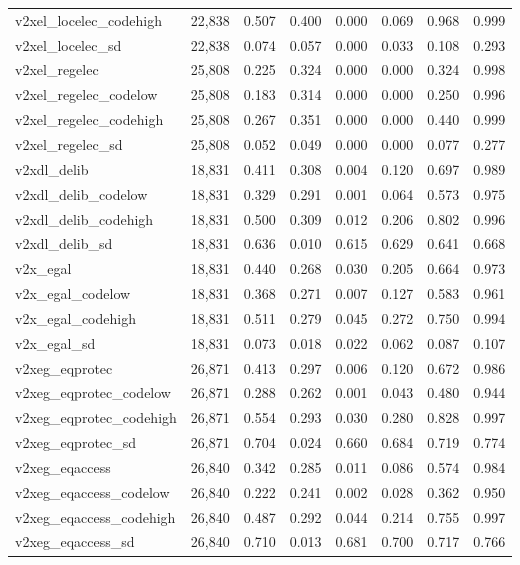 \begin{table}[!htbp]
\begin{tabular}{@{\extracolsep{5pt}}lccccccc}
v2xel\_locelec\_codehigh & 22,838 & 0.507 & 0.400 & 0.000 & 0.069 & 0.968 & 0.999 \\ 
v2xel\_locelec\_sd & 22,838 & 0.074 & 0.057 & 0.000 & 0.033 & 0.108 & 0.293 \\ 
v2xel\_regelec & 25,808 & 0.225 & 0.324 & 0.000 & 0.000 & 0.324 & 0.998 \\ 
v2xel\_regelec\_codelow & 25,808 & 0.183 & 0.314 & 0.000 & 0.000 & 0.250 & 0.996 \\ 
v2xel\_regelec\_codehigh & 25,808 & 0.267 & 0.351 & 0.000 & 0.000 & 0.440 & 0.999 \\ 
v2xel\_regelec\_sd & 25,808 & 0.052 & 0.049 & 0.000 & 0.000 & 0.077 & 0.277 \\ 
v2xdl\_delib & 18,831 & 0.411 & 0.308 & 0.004 & 0.120 & 0.697 & 0.989 \\ 
v2xdl\_delib\_codelow & 18,831 & 0.329 & 0.291 & 0.001 & 0.064 & 0.573 & 0.975 \\ 
v2xdl\_delib\_codehigh & 18,831 & 0.500 & 0.309 & 0.012 & 0.206 & 0.802 & 0.996 \\ 
v2xdl\_delib\_sd & 18,831 & 0.636 & 0.010 & 0.615 & 0.629 & 0.641 & 0.668 \\ 
v2x\_egal & 18,831 & 0.440 & 0.268 & 0.030 & 0.205 & 0.664 & 0.973 \\ 
v2x\_egal\_codelow & 18,831 & 0.368 & 0.271 & 0.007 & 0.127 & 0.583 & 0.961 \\ 
v2x\_egal\_codehigh & 18,831 & 0.511 & 0.279 & 0.045 & 0.272 & 0.750 & 0.994 \\ 
v2x\_egal\_sd & 18,831 & 0.073 & 0.018 & 0.022 & 0.062 & 0.087 & 0.107 \\ 
v2xeg\_eqprotec & 26,871 & 0.413 & 0.297 & 0.006 & 0.120 & 0.672 & 0.986 \\ 
v2xeg\_eqprotec\_codelow & 26,871 & 0.288 & 0.262 & 0.001 & 0.043 & 0.480 & 0.944 \\ 
v2xeg\_eqprotec\_codehigh & 26,871 & 0.554 & 0.293 & 0.030 & 0.280 & 0.828 & 0.997 \\ 
v2xeg\_eqprotec\_sd & 26,871 & 0.704 & 0.024 & 0.660 & 0.684 & 0.719 & 0.774 \\ 
v2xeg\_eqaccess & 26,840 & 0.342 & 0.285 & 0.011 & 0.086 & 0.574 & 0.984 \\ 
v2xeg\_eqaccess\_codelow & 26,840 & 0.222 & 0.241 & 0.002 & 0.028 & 0.362 & 0.950 \\ 
v2xeg\_eqaccess\_codehigh & 26,840 & 0.487 & 0.292 & 0.044 & 0.214 & 0.755 & 0.997 \\ 
v2xeg\_eqaccess\_sd & 26,840 & 0.710 & 0.013 & 0.681 & 0.700 & 0.717 & 0.766 \\ 

\end{tabular}
\end{table}
